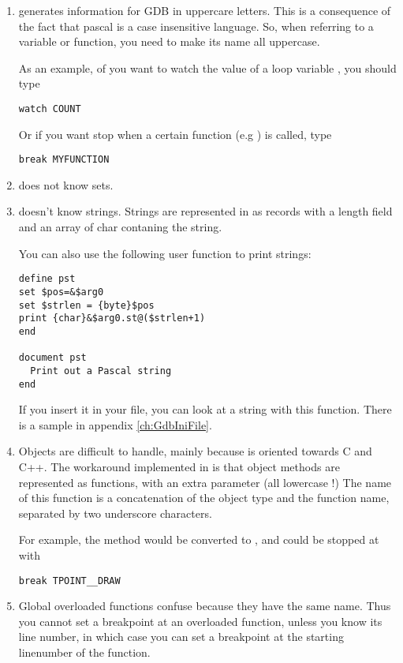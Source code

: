 \begin{enumerate}
\item \fpc generates information for GDB in uppercare letters. This is a
consequence of the fact that pascal is a case insensitive language. So, when
referring to a variable or function, you need to make its name all
uppercase.

As an example, of you want to watch the value of a loop variable
, you should type
\begin{verbatim}
watch COUNT
\end{verbatim}
Or if you want stop when a certain function (e.g ) is called,
type
\begin{verbatim}
break MYFUNCTION
\end{verbatim}

\item {} does not know sets.

\item {} doesn't know strings. Strings are represented in 
as records with a length field and an array of char contaning the string.

You can also use the following user function to print strings:
\begin{verbatim}
define pst
set $pos=&$arg0
set $strlen = {byte}$pos
print {char}&$arg0.st@($strlen+1)
end

document pst
  Print out a Pascal string
end
\end{verbatim}
If you insert it in your  file, you can look at a string with this
function. There is a sample  in appendix \ref{ch:GdbIniFile}.

\item Objects are difficult to handle, mainly because  is oriented
towards C and C++. The workaround implemented in \fpc is that object methods
are represented as functions, with an extra parameter  (all
lowercase !) The name of this function is a concatenation of the object type
and the function name, separated by two underscore characters.

For example, the method  would be converted to
, and could be stopped at with
\begin{verbatim}
break TPOINT__DRAW
\end{verbatim}

\item Global overloaded functions confuse  because they have the same
name. Thus you cannot set a breakpoint at an overloaded function, unless you
know its line number, in which case you can set a breakpoint at the
starting linenumber of the function.
\end{enumerate}

